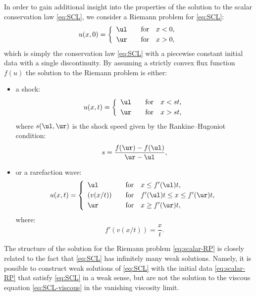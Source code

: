 In order to gain additional insight into the properties of the solution to the scalar conservation law \eqref{eq:SCL}, we consider a Riemann problem for \eqref{eq:SCL}:
\begin{equation} \label{eq:scalar-RP}
u(x,0) = \left\{ \begin{array}{ll}
	\ul \quad & \text{for} \quad x<0, \\[0.25em]
	\ur \quad & \text{for} \quad x>0, \end{array} \right.
\end{equation}
which is simply the conservation law \eqref{eq:SCL} with a piecewise constant initial data with a single discontinuity. By assuming a strictly convex flux function $ f(u) $ the solution to the Riemann problem is either:
\begin{itemize}
\item a shock:
\begin{equation} \label{eq:scalar-shock}
u(x,t) = \left\{ \begin{array}{ll}
	\ul \quad & \text{for} \quad x<st, \\[0.25em]
	\ur \quad & \text{for} \quad x>st, \end{array} \right.
\end{equation}
where $ s (\ul,\ur) $ is the shock speed given by the Rankine--Hugoniot condition:
\begin{equation}
s = \frac{f(\ur) - f(\ul)}{\ur - \ul},
\end{equation}
\item or a rarefaction wave:
\begin{equation} \label{eq:scalar-rarefaction}
u(x,t) = \left\{ \begin{array}{lll}
	\ul \quad & \text{for} \quad x \leq f'(\ul)t, \\[0.25em]
	(v(x/t)) \quad & \text{for} \quad f'(\ul)t \leq x \leq f'(\ur)t, \\[0.25em]
	\ur \quad & \text{for} \quad x \geq f'(\ur)t, \end{array} \right.
\end{equation}
where:
\begin{equation}
f'\left( v(x/t) \right) = \frac{x}{t}.
\end{equation}
\end{itemize} 
The structure of the solution for the Riemann problem \eqref{eq:scalar-RP} is closely related to the fact that \eqref{eq:SCL} has infinitely many weak solutions. Namely, it is possible to construct weak solutions of \eqref{eq:SCL} with the initial data \eqref{eq:scalar-RP} that satisfy \eqref{eq:SCL} in a weak sense, but are not the solution to the viscous equation \eqref{eq:SCL-viscous} in the vanishing viscosity limit.

